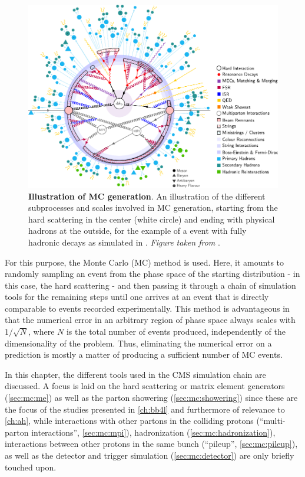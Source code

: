 \begin{figure}[!t]
    \centering
    \includegraphics[width=\textwidth]{figures/mc_sketch.pdf}
    \caption{\textbf{Illustration of MC generation}. An illustration of the different subprocesses and scales involved in MC generation, starting from the hard scattering in the center (white circle) and ending with physical hadrons at the outside, for the example of a \pptt event with fully hadronic decays as simulated in \pythia. \textit{Figure taken from }.}
    \label{fig:mc:sketch}
\end{figure}

For this purpose, the Monte Carlo (MC) method is used. Here, it amounts to randomly sampling an event from the phase space of the starting distribution - in this case, the hard scattering - and then passing it through a chain of simulation tools for the remaining steps until one arrives at an event that is directly comparable to events recorded experimentally. %
This method is advantageous in that the numerical error in an arbitrary region of phase space always scales with $1/\sqrt{N}$, where $N$ is the total number of events produced, independently of the dimensionality of the problem. Thus, eliminating the numerical error on a prediction is mostly a matter of producing a sufficient number of MC events.

In this chapter, the different tools used in the CMS simulation chain are discussed. A focus is laid on the hard scattering or matrix element generators (\cref{sec:mc:me}) as well as the parton showering (\cref{sec:mc:showering}) since these are the focus of the studies presented in \cref{ch:bb4l} and furthermore of relevance to \cref{ch:ah}, while interactions with other partons in the colliding protons (``multi-parton interactions'', \cref{sec:mc:mpi}), hadronization (\cref{sec:mc:hadronization}), interactions between other protons in the same bunch (``pileup'', \cref{sec:mc:pileup}), as well as the detector and trigger simulation (\cref{sec:mc:detector}) are only briefly touched upon. 

